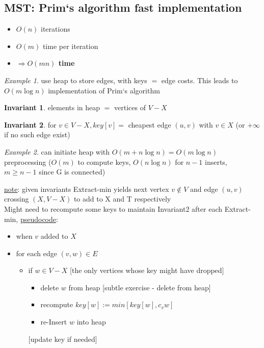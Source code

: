 \documentclass[a4paper,12pt]{article}
\theoremstyle{plain}
\theoremstyle{definition}
\newtheorem{invariant}{Invariant}[subsection]
\theoremstyle{remark}
\newtheorem*{example}{Example}
\begin{document}
\subsection{MST: Prim`s algorithm fast implementation}
\begin{itemize}
	\item $O(n)$ iterations
	\item $O(m)$ time per iteration
	\item \textbf{$\Rightarrow O(mn)$ time}
\end{itemize}

\begin{example}use heap to store edges, with keys $=$ edge costs. This leads to $O(m \log n)$ implementation of Prim`s algorithm\end{example}

\begin{invariant}elements in heap $=$ vertices of $V-X$\end{invariant}
\begin{invariant}for $v \in V-X, key[v] =$ cheapest edge $(u,v)$ with $v \in X$ (or $+\infty$ if no such edge exist)\end{invariant}

\begin{example}can initiate heap with $O(m+n \log n) = O(m \log n)$ preprocessing ($O(m)$ to compute keys, $O(n \log n)$ for $n-1$ inserts, $m \geq n-1$ since G is connected)\\\end{example}

\underline{note}: given invariants Extract-min yields next vertex $v \notin V$ and edge $(u,v)$ crossing $(X,V-X)$ to add to X and T respectively
\\

Might need to recompute some keys to maintain Invariant2 after each Extract-min, \underline{pseudocode}:
\begin{itemize}
\item when $v$ added to $X$
\item for each edge $(v,w) \in E$
	\begin{itemize}
		\item if $w \in V-X$
		[the only vertices whose key might have dropped]
		\begin{itemize}
			\item delete $w$ from heap
			[subtle exercise - delete from heap]
			\item recompute $key[w]:= min[key[w],c_vw]$
			\item re-Insert $w$ into heap
		\end{itemize}
		[update key if needed]\\
	\end{itemize}
\end{itemize}
\end{document}
